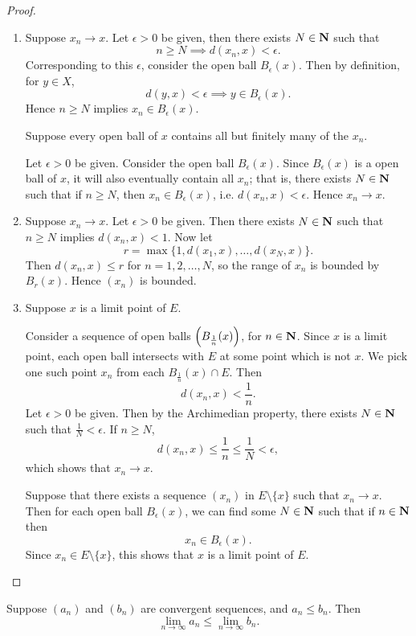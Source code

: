 \begin{proof} \
\begin{enumerate}[label=(\roman*)]
\item \fbox{$\implies$} Suppose $x_n\to x$. Let $\epsilon>0$ be given, then there exists $N\in\mathbf N$ such that
\[n\ge N\implies d(x_n,x)<\epsilon.\]
Corresponding to this $\epsilon$, consider the open ball $B_\epsilon(x)$. Then by definition, for $y\in X$, 
\[d(y,x)<\epsilon\implies y\in B_\epsilon(x).\]
Hence $n\ge N$ implies $x_n\in B_\epsilon(x)$.

\fbox{$\impliedby$} Suppose every open ball of $x$ contains all but finitely many of the $x_n$.

Let $\epsilon>0$ be given. Consider the open ball $B_\epsilon(x)$. Since $B_\epsilon(x)$ is a open ball of $x$, it will also eventually contain all $x_n$; that is, there exists $N\in\mathbf N$ such that if $n\ge N$, then $x_n\in B_\epsilon(x)$, i.e. $d(x_n,x)<\epsilon$. Hence $x_n\to x$.

\item Suppose $x_n\to x$. Let $\epsilon>0$ be given. Then there exists $N\in\mathbf N$ such that $n\ge N$ implies $d(x_n,x)<1$. Now let
\[r=\max\{1,d(x_1,x),\dots,d(x_N,x)\}.\]
Then $d(x_n,x)\le r$ for $n=1,2,\dots,N$, so the range of $x_n$ is bounded by $B_r(x)$. Hence $(x_n)$ is bounded.

\item \fbox{$\implies$} Suppose $x$ is a limit point of $E$. 

Consider a sequence of open balls $\left(B_\frac{1}{n}(x)\right)$, for $n\in\mathbf N$. Since $x$ is a limit point, each open ball intersects with $E$ at some point which is not $x$. We pick one such point $x_n$ from each $B_\frac{1}{n}(x)\cap E$. Then
\[d(x_n,x)<\frac{1}{n}.\]
Let $\epsilon>0$ be given. Then by the Archimedian property, there exists $N\in\mathbf N$ such that $\frac{1}{N}<\epsilon$. If $n\ge N$,
\[d(x_n,x)\le\frac{1}{n}\le\frac{1}{N}<\epsilon,\]
which shows that $x_n\to x$.

\fbox{$\impliedby$} Suppose that there exists a sequence $(x_n)$ in $E\setminus\{x\}$ such that $x_n\to x$. Then for each open ball $B_\epsilon(x)$, we can find some $N\in\mathbf N$ such that if $n\in\mathbf N$ then
\[x_n\in B_\epsilon(x).\]
Since $x_n\in E\setminus\{x\}$, this shows that $x$ is a limit point of $E$.
\end{enumerate}
\end{proof}

\begin{proposition}[Ordering]
Suppose $(a_n)$ and $(b_n)$ are convergent sequences, and $a_n \le b_n$. Then
\[\lim_{n\to\infty}a_n\le\lim_{n\to\infty}b_n.\]
\end{proposition}

